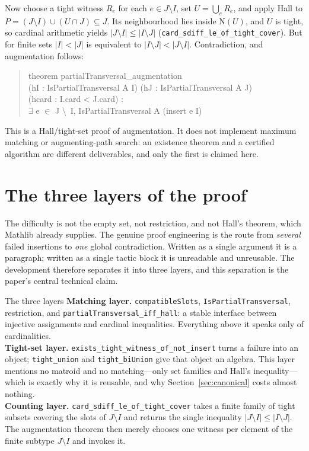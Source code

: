 \documentclass[11pt]{article}
\newcommand{\lean}[1]{\texttt{#1}}
\newcommand{\N}{\mathrm{N}}
\begin{document}
Now choose a tight witness $R_e$ for each $e\in J\setminus I$, set $U=\bigcup_e R_e$, and apply
Hall to $P=(J\setminus I)\cup(U\cap J)\subseteq J$. Its neighbourhood lies inside $\N(U)$, and $U$
is tight, so cardinal arithmetic yields $|J\setminus I|\le|I\setminus J|$
(\lean{card\_sdiff\_le\_of\_tight\_cover}). But for finite sets $|I|<|J|$ is equivalent to
$|I\setminus J|<|J\setminus I|$. Contradiction, and augmentation follows:
\begin{quote}\ttfamily\small\noindent
theorem partialTransversal\_augmentation\\
\hspace*{1em}(hI : IsPartialTransversal A I) (hJ : IsPartialTransversal A J)\\
\hspace*{1em}(hcard : I.card < J.card) :\\
\hspace*{1em}$\exists$ e $\in$ J \textbackslash\ I, IsPartialTransversal A (insert e I)
\end{quote}
This is a Hall/tight-set proof of augmentation. It does not implement maximum matching or
augmenting-path search: an existence theorem and a certified algorithm are different deliverables,
and only the first is claimed here.

\section{The three layers of the proof}\label{sec:q3}

The difficulty is not the empty set, not restriction, and not Hall's theorem, which Mathlib
already supplies. The genuine proof engineering is the route from \emph{several} failed insertions
to \emph{one} global contradiction. Written as a single argument it is a paragraph; written as a
single tactic block it is unreadable and unreusable. The development therefore separates it into
three layers, and this separation is the paper's central technical claim.

\begin{recipebox}{The three layers}
\textbf{Matching layer.} \lean{compatibleSlots}, \lean{IsPartialTransversal}, restriction, and
\lean{partialTransversal\_iff\_hall}: a stable interface between injective assignments and
cardinal inequalities. Everything above it speaks only of cardinalities.\\[3pt]
\textbf{Tight-set layer.} \lean{exists\_tight\_witness\_of\_not\_insert} turns a failure into an
object; \lean{tight\_union} and \lean{tight\_biUnion} give that object an algebra. This layer
mentions no matroid and no matching---only set families and Hall's inequality---which is exactly
why it is reusable, and why Section~\ref{sec:canonical} costs almost nothing.\\[3pt]
\textbf{Counting layer.} \lean{card\_sdiff\_le\_of\_tight\_cover} takes a finite family of tight
subsets covering the slots of $J\setminus I$ and returns the single inequality
$|J\setminus I|\le|I\setminus J|$. The augmentation theorem then merely chooses one witness per
element of the finite subtype $J\setminus I$ and invokes it.
\end{recipebox}
\end{document}
